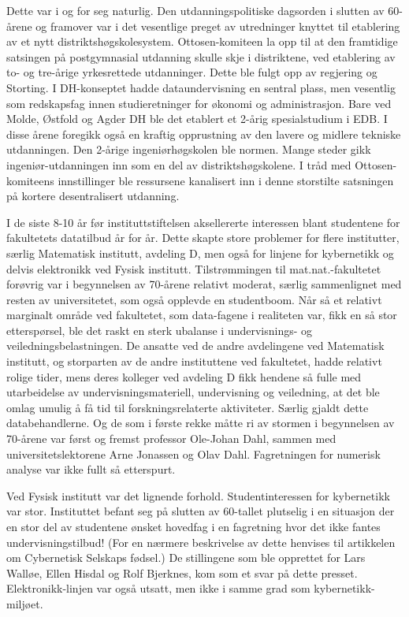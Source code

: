 \documentclass[../../main.tex]{subfiles}
\begin{document}
Dette var i og for seg naturlig. Den utdanningspolitiske dagsorden i slutten av 60-årene og framover var i det vesentlige preget av utredninger knyttet til etablering av et nytt distriktshøgskolesystem. Ottosen-komiteen la opp til at den framtidige satsingen på postgymnasial utdanning skulle skje i distriktene, ved etablering av to- og tre-årige yrkesrettede utdanninger. Dette ble fulgt opp av regjering og Storting. I DH-konseptet hadde dataundervisning en sentral plass, men vesentlig som redskapsfag innen studieretninger for økonomi og administrasjon. Bare ved Molde, Østfold og Agder DH ble det etablert et 2-årig spesialstudium i EDB. I disse årene foregikk også en kraftig opprustning av den lavere og midlere tekniske utdanningen. Den 2-årige ingeniørhøgskolen ble normen. Mange steder gikk ingeniør-utdanningen inn som en del av distriktshøgskolene. I tråd med Ottosen-komiteens innstillinger ble ressursene kanalisert inn i denne storstilte satsningen på kortere desentralisert utdanning.

I de siste 8-10 år før instituttstiftelsen aksellererte interessen blant studentene for fakultetets datatilbud år for år. Dette skapte store problemer for flere institutter, særlig Matematisk institutt, avdeling D, men også for linjene for kybernetikk og delvis elektronikk ved Fysisk institutt. Tilstrømmingen til mat.nat.-fakultetet forøvrig var i begynnelsen av 70-årene relativt moderat, særlig sammenlignet med resten av universitetet, som også opplevde en
studentboom. Når så et relativt marginalt område ved fakultetet, som data-fagene i realiteten var, fikk en så stor etterspørsel, ble det raskt en sterk ubalanse i undervisnings- og veiledningsbelastningen. De ansatte ved de andre avdelingene ved Matematisk institutt, og storparten av de andre instituttene ved fakultetet, hadde relativt rolige tider, mens deres kolleger ved avdeling D fikk hendene så fulle med utarbeidelse av undervisningsmateriell, undervisning og veiledning, at det ble omlag umulig å få tid til forskningsrelaterte aktiviteter. Særlig gjaldt dette databehandlerne. Og de som i første rekke måtte ri av stormen i begynnelsen av 70-årene var først og fremst professor Ole-Johan Dahl, sammen med universitetslektorene Arne Jonassen og Olav Dahl. Fagretningen for numerisk analyse var ikke fullt så etterspurt.

Ved Fysisk institutt var det lignende forhold. Studentinteressen for kybernetikk var stor. Instituttet befant seg på slutten av 60-tallet plutselig i en situasjon der en stor del av studentene ønsket hovedfag i en fagretning hvor det ikke fantes undervisningstilbud! (For en nærmere beskrivelse av dette henvises til artikkelen om Cybernetisk Selskaps fødsel.) De stillingene som ble opprettet for Lars Walløe, Ellen Hisdal og Rolf Bjerknes, kom som et svar på dette presset. Elektronikk-linjen var også utsatt, men ikke i samme grad som kybernetikk-miljøet.
\end{document}
